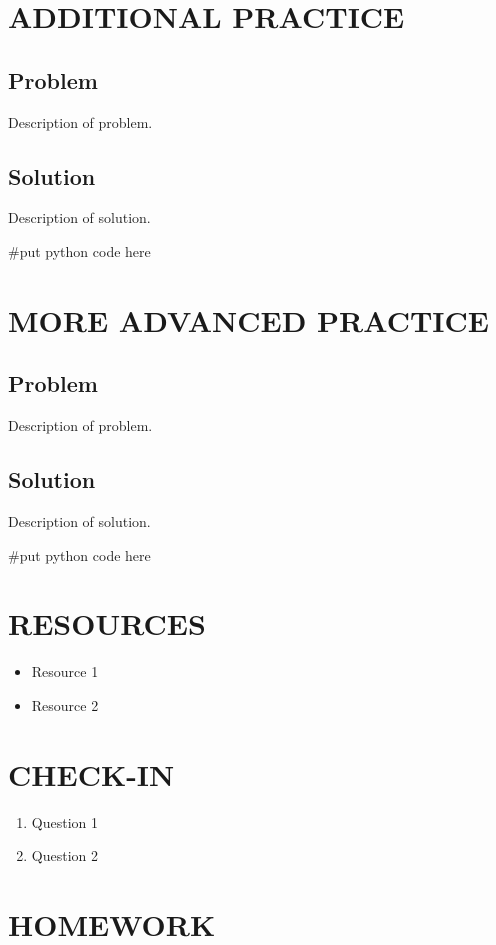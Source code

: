 \documentclass[14pt]{extreport}%
\begin{document}
\section*{ADDITIONAL PRACTICE} 
\subsection*{Problem}
Description of problem.
\subsection*{Solution}
Description of solution. \\
\begin{python}
#put python code here
\end{python}

\section*{MORE ADVANCED PRACTICE} 
\subsection*{Problem}
Description of problem.
\subsection*{Solution}
Description of solution. \\
\begin{python}
#put python code here
\end{python}

\section*{RESOURCES}
\begin{itemize}
    \item Resource 1
    \item Resource 2
\end{itemize}

\section*{CHECK-IN}
\begin{enumerate}
    \item Question 1
    \item Question 2
\end{enumerate}

\section*{HOMEWORK}
\end{document}
